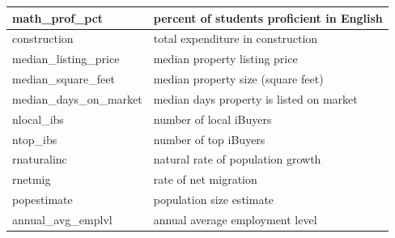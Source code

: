 \begin{table}
\begin{tabular}{l|l}
    math\_prof\_pct &             percent of students proficient in English \\ \hline
    construction &              total expenditure in construction \\ \hline
    median\_listing\_price &           median property listing price \\ \hline
    median\_square\_feet &           median property size (square feet) \\ \hline
    median\_days\_on\_market &           median days property is listed on market \\ \hline
    nlocal\_ibs &        number of local iBuyers \\ \hline
    ntop\_ibs &        number of top iBuyers \\ \hline
    rnaturalinc &       natural rate of population growth \\ \hline
    rnetmig &         rate of net migration \\ \hline
    popestimate &         population size estimate \\ \hline
    annual\_avg\_emplvl &            annual average employment level \\ \hline
    \end{tabular}
\end{table}

